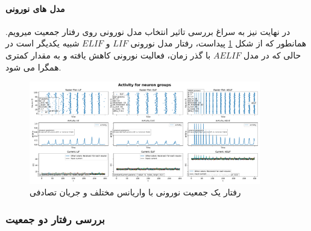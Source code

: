 \documentclass{report}
\begin{document}
            \paragraph*{مدل های نورونی}
                در نهایت نیز به سراغ بررسی تاثیر انتخاب مدل نورونی روی رفتار جمعیت میرویم. همانطور که از شکل
                \ref{fig:part2-one-ng-full-synapse-diff-neuron-model}
                پیداست، رفتار مدل نورونی 
                $LIF$ و
                $ELIF$ 
                شبیه یکدیگر است در حالی که در مدل 
                $AELIF$ 
                با گذر زمان، فعالیت نورونی کاهش یافته و به مقدار کمتری همگرا می شود.
                \begin{figure}[!ht]
                    \centering
                    \includegraphics[width=0.9\textwidth]{plots/part2-one-ng-full-synapse-diff-neuron-model.pdf} 
                    \caption{رفتار یک جمعیت نورونی با واریانس مختلف و جریان تصادفی}
                    \label{fig:part2-one-ng-full-synapse-diff-neuron-model}
                \end{figure}
        \subsubsection*{بررسی رفتار دو جمعیت}
\end{document}
